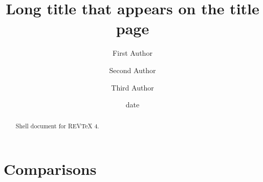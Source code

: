 \documentclass[aps,preprint]{revtex4}%
\begin{document}
\title[Short title for running header]{Long title that appears on the title page}
\author{First Author}
\author{Second Author}
\author{Third Author}

\begin{abstract}
Shell document for REV\TeX{} 4.

\end{abstract}
\date[Date text]{date}




\maketitle
\tableofcontents


\section{Comparisons}%
\end{document}
